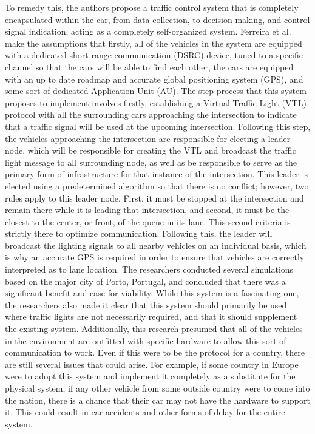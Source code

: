 To remedy this, the authors propose a traffic control system that is completely encapsulated within the car, from data collection, to decision making, and control signal indication, acting as a completely self-organized system.  Ferreira et al. make the assumptions that firstly, all of the vehicles in the system are equipped with a dedicated short range communication (DSRC) device, tuned to a specific channel so that the cars will be able to find each other, the cars are equipped with an up to date roadmap and accurate global positioning system (GPS), and some sort of dedicated Application Unit (AU).  The step process that this system proposes to implement involves firstly, establishing a Virtual Traffic Light (VTL) protocol with all the surrounding cars approaching the intersection to indicate that a traffic signal will be used at the upcoming intersection.  Following this step, the vehicles approaching the intersection are responsible for electing a leader node, which will be responsible for creating the VTL and broadcast the traffic light message to all surrounding node, as well as be responsible to serve as the primary form of infrastructure for that instance of the intersection.  This leader is elected using a predetermined algorithm so that there is no conflict; however, two rules apply to this leader node.  First, it must be stopped at the intersection and remain there while it is leading that intersection, and second, it must be the closest to the center, or front, of the queue in its lane.  This second criteria is strictly there to optimize communication.  Following this, the leader will broadcast the lighting signals to all nearby vehicles on an individual basis, which is why an accurate GPS is required in order to ensure that vehicles are correctly interpreted as to lane location.  The researchers conducted several simulations based on the major city of Porto, Portugal, and concluded that there was a significant benefit and case for viability\cite{V2V}.  While this system is a fascinating one, the researchers also made it clear that this system should primarily be used where traffic lights are not necessarily required, and that it should supplement the existing system.  Additionally, this research presumed that all of the vehicles in the environment are outfitted with specific hardware to allow this sort of communication to work.  Even if this were to be the protocol for a country, there are still several issues that could arise.  For example, if some country in Europe were to adopt this system and implement it completely as a substitute for the physical system, if any other vehicle from some outside country were to come into the nation, there is a chance that their car may not have the hardware to support it.  This could result in car accidents and other forms of delay for the entire system.

